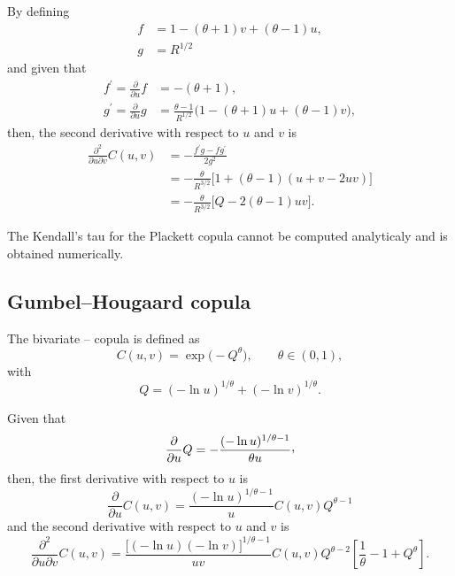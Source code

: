 \documentclass{article}
\def\ccom{\raisebox{.45ex}{\textrm{,}}}
\begin{document}
By defining
\begin{align}
    f &= 1 - (\theta+1) v + (\theta-1) u,\\
    g &= R^{1/2}
\end{align}
and given that
\begin{align}
    f^\prime = \frac{\partial}{\partial u} f &= -(\theta + 1),\\
    g^\prime = \frac{\partial}{\partial u} g &= \frac{\theta-1}{R^{1/2}} \Big(
        1 - (\theta+1) u + (\theta-1) v \Big),
\end{align}
then, the second derivative with respect to $u$ and $v$ is 
\begin{align}
    \frac{\partial^2}{\partial u\partial v}C(u,v)
        &= - \frac{f^\prime g - fg^\prime}{2 g^2}
        \nonumber\\
        &= - \frac\theta{R^{3/2}}\Big[
            1 + (\theta-1)(u+v-2uv)\Big]
        \nonumber\\
        &= - \frac\theta{R^{3/2}}\Big[
            Q - 2(\theta-1)uv\Big].
\end{align}

The Kendall's tau for the Plackett copula cannot be computed analyticaly
  and is obtained numerically.




\subsection*{Gumbel--Hougaard copula}
The bivariate \cite{Gumbel60}--\cite{Hougaard86} copula is defined as
\begin{equation}
    C(u,v)= \exp\Big(-Q^\theta \Big), \qquad \theta \in (0, 1),
\end{equation}
with 
\begin{equation}
    Q= (- \ln u)^{1/\theta} + (- \ln v)^{1/\theta}.
\end{equation}

Given that
\begin{equation}
    \frac{\partial}{\partial u}Q
        = -\frac{(- \ln u)^{1/\theta-1}}{\theta u}\ccom
\end{equation}
then, the first derivative with respect to $u$ is 
\begin{equation}
    \frac{\partial}{\partial u}C(u,v)
    = \frac{ (-\ln u)^{1/\theta - 1} }u C(u, v) Q^{\theta-1}
\end{equation}
and the second derivative with respect to $u$ and $v$ is 
\begin{equation}
    \frac{\partial^2}{\partial u\partial v}C(u,v)
        = \frac{ \Big[ (-\ln u)(-\ln v) \Big]^{1/\theta - 1} }{uv}
            C(u, v) Q^{\theta-2}
            \left[\frac1\theta -1 + Q^\theta\right].
\end{equation}
\end{document}
